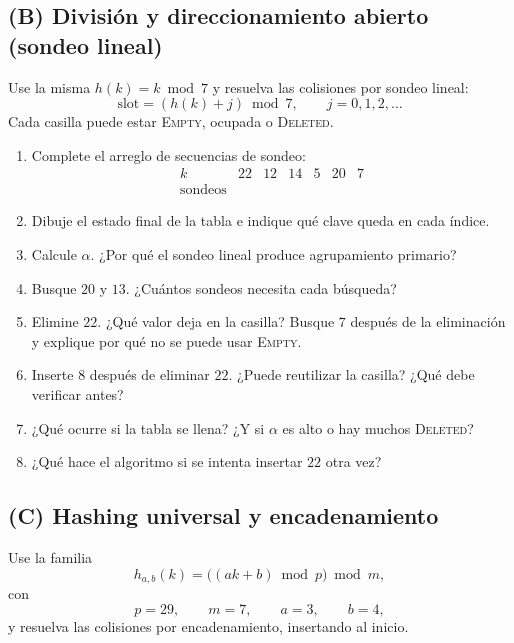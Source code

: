 \documentclass[11pt]{article}
\begin{document}
\subsection*{(B) División y direccionamiento abierto (sondeo lineal)}

Use la misma \(h(k)=k\bmod 7\) y resuelva las colisiones por sondeo lineal:
\[
\text{slot}=(h(k)+j)\bmod 7,\qquad j=0,1,2,\dots
\]
Cada casilla puede estar \textsc{Empty}, ocupada o \textsc{Deleted}.

\begin{enumerate}[label=(\alph*),itemsep=0.25em]
\item Complete el arreglo de secuencias de sondeo:
\[
\begin{array}{c|cccccc}
k & 22 & 12 & 14 & 5 & 20 & 7\\ \hline
\text{sondeos} & & & & & &
\end{array}
\]
\item Dibuje el estado final de la tabla e indique qué clave queda en cada índice.
\item Calcule \(\alpha\). ¿Por qué el sondeo lineal produce agrupamiento primario?
\item Busque \(20\) y \(13\). ¿Cuántos sondeos necesita cada búsqueda?
\item Elimine \(22\). ¿Qué valor deja en la casilla? Busque \(7\) después de la eliminación y explique por qué no se puede usar \textsc{Empty}.
\item Inserte \(8\) después de eliminar \(22\). ¿Puede reutilizar la casilla? ¿Qué debe verificar antes?
\item ¿Qué ocurre si la tabla se llena? ¿Y si \(\alpha\) es alto o hay muchos \textsc{Deleted}?
\item ¿Qué hace el algoritmo si se intenta insertar \(22\) otra vez?
\end{enumerate}

\subsection*{(C) Hashing universal y encadenamiento}

Use la familia
\[
h_{a,b}(k)=\big((ak+b)\bmod p\big)\bmod m,
\]
con
\[
p=29,\qquad m=7,\qquad a=3,\qquad b=4,
\]
y resuelva las colisiones por encadenamiento, insertando al inicio.
\end{document}

